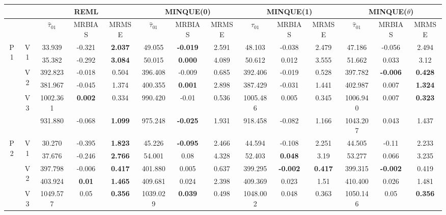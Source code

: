 \documentclass[12pt,a4paper]{article}
\begin{document}
\begin{sidewaystable}[ht]
\centering
{\footnotesize
\begin{tabular}{cc|ccc|ccc|ccc|ccc|}
   & & \multicolumn{3}{c|}{REML}&\multicolumn{3}{c|}{MINQUE(0)}&\multicolumn{3}{c|}{MINQUE(1)}&\multicolumn{3}{c|}{MINQUE($\theta$)}\\ \hline
 &  & $\hat{\tau}_{01}$ & MRBIAS & MRMSE & $\hat{\tau}_{01}$ & MRBIAS & MRMSE & $\hat{\tau}_{01}$ & MRBIAS & MRMSE & $\hat{\tau}_{01}$ & MRBIAS & MRMSE \\ 
  \hline
\multirow{6}{*}{P1} & \multirow{2}{*}{V1} & 33.939 & -0.321 & \textbf{2.037} & 49.055 & \textbf{-0.019} & 2.591 & 48.103 & -0.038 & 2.479 & 47.186 & -0.056 & 2.494 \\ 
   &  & 35.382 & -0.292 & \textbf{3.084} & 50.015 & \textbf{0.000} & 4.089 & 50.612 & 0.012 & 3.555 & 51.662 & 0.033 & 3.12 \\ 
   & \multirow{2}{*}{V2} & 392.823 & -0.018 & 0.504 & 396.408 & -0.009 & 0.685 & 392.406 & -0.019 & 0.528 & 397.782 & \textbf{-0.006} & \textbf{0.428} \\ 
   &  & 381.967 & -0.045 & 1.374 & 400.355 & \textbf{0.001} & 2.898 & 387.429 & -0.031 & 1.441 & 402.987 & 0.007 & \textbf{1.324} \\ 
   & \multirow{2}{*}{V3} & 1002.361 & \textbf{0.002} & 0.334 & 990.420 & -0.01 & 0.536 & 1005.486 & 0.005 & 0.345 & 1006.940 & 0.007 & \textbf{0.323} \\ 
   &  & 931.880 & -0.068 & \textbf{1.099} & 975.248 & \textbf{-0.025} & 1.931 & 918.458 & -0.082 & 1.166 & 1043.207 & 0.043 & 1.437 \\ 
   \hline \hline\multirow{6}{*}{P2} & \multirow{2}{*}{V1} & 30.270 & -0.395 & \textbf{1.823} & 45.226 & \textbf{-0.095} & 2.466 & 44.594 & -0.108 & 2.251 & 44.505 & -0.11 & 2.233 \\ 
   &  & 37.676 & -0.246 & \textbf{2.766} & 54.001 & 0.08 & 4.328 & 52.403 & \textbf{0.048} & 3.19 & 53.277 & 0.066 & 3.235 \\ 
   & \multirow{2}{*}{V2} & 397.798 & -0.006 & \textbf{0.417} & 401.880 & 0.005 & 0.637 & 399.295 & \textbf{-0.002} & \textbf{0.417} & 399.315 & \textbf{-0.002} & 0.419 \\ 
   &  & 403.924 & \textbf{0.01} & \textbf{1.465} & 409.681 & 0.024 & 2.398 & 409.369 & 0.023 & 1.51 & 410.400 & 0.026 & 1.481 \\ 
   & \multirow{2}{*}{V3} & 1049.577 & 0.05 & \textbf{0.356} & 1039.029 & \textbf{0.039} & 0.498 & 1048.002 & 0.048 & 0.363 & 1050.146 & 0.05 & \textbf{0.356} \\ 

\end{tabular}}
\end{sidewaystable}
\end{document}
